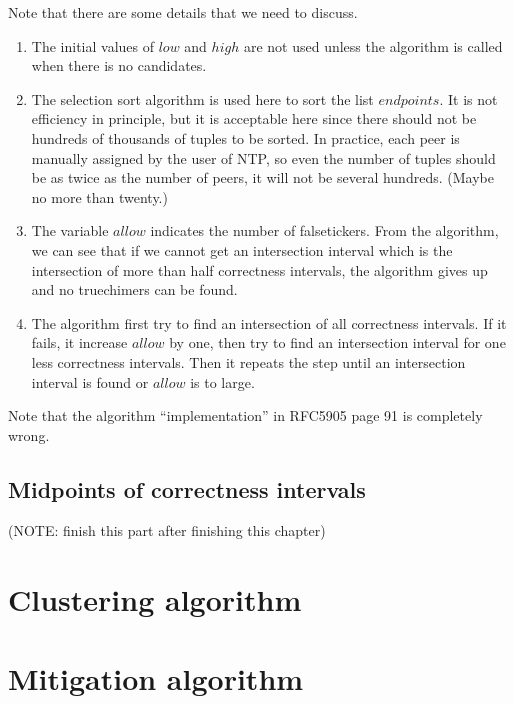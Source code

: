 Note that there are some details that we need to discuss. 
\begin{enumerate}
    \item 
        The initial values of $low$ and $high$ are not used unless the
        algorithm is called when there is no candidates.
    \item 
        The selection sort algorithm is used here to sort the list
        $endpoints$. It is not efficiency in principle, but it is acceptable
        here since there should not be hundreds of thousands of tuples to be
        sorted. In practice, each peer is manually assigned by the user of
        NTP, so even the number of tuples should be as twice as the number of
        peers, it will not be several hundreds. (Maybe no more than twenty.)
    \item
        The variable $allow$ indicates the number of falsetickers. From the
        algorithm, we can see that if we cannot get an intersection interval
        which is the intersection of more than half correctness intervals,
        the algorithm gives up and no truechimers can be
        found.~\cite{clock_selection}
    \item
        The algorithm first try to find an intersection of all correctness
        intervals. If it fails, it increase $allow$ by one, then try to find
        an intersection interval for one less correctness intervals. Then it
        repeats the step until an intersection interval is found or $allow$
        is to large.
\end{enumerate}

Note that the algorithm ``implementation'' in RFC5905 page 91 is completely wrong.

\subsection{Midpoints of correctness intervals}
\label{midpoints_of_correctness_intervals}
(NOTE: finish this part after finishing this chapter)

\section{Clustering algorithm}%
\label{sec:clustering_algorithm}

\section{Mitigation algorithm}%
\label{sec:mitigation_algorithm}



